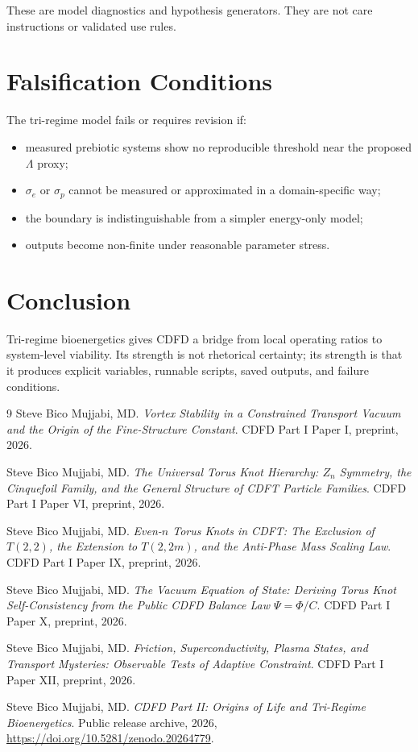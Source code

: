\documentclass[12pt,a4paper]{article}
\begin{document}
These are model diagnostics and hypothesis generators. They are not care
instructions or validated use rules.

\section{Falsification Conditions}
The tri-regime model fails or requires revision if:
\begin{itemize}
    \item measured prebiotic systems show no reproducible threshold near the
    proposed $\Lambda$ proxy;
    \item $\sigma_e$ or $\sigma_p$ cannot be measured or approximated in a
    domain-specific way;
    \item the boundary is indistinguishable from a simpler energy-only model;
    \item outputs become non-finite under reasonable parameter stress.
\end{itemize}

\section{Conclusion}
Tri-regime bioenergetics gives CDFD a bridge from local operating ratios to
system-level viability. Its strength is not rhetorical certainty; its strength
is that it produces explicit variables, runnable scripts, saved outputs, and
failure conditions.
\begin{thebibliography}{9}
Steve Bico Mujjabi, MD. \emph{Vortex Stability in a Constrained Transport Vacuum and the Origin of the Fine-Structure Constant}. CDFD Part I Paper I, preprint, 2026.

Steve Bico Mujjabi, MD. \emph{The Universal Torus Knot Hierarchy: $Z_n$ Symmetry, the Cinquefoil Family, and the General Structure of CDFT Particle Families}. CDFD Part I Paper VI, preprint, 2026.

Steve Bico Mujjabi, MD. \emph{Even-$n$ Torus Knots in CDFT: The Exclusion of $T(2,2)$, the Extension to $T(2,2m)$, and the Anti-Phase Mass Scaling Law}. CDFD Part I Paper IX, preprint, 2026.

Steve Bico Mujjabi, MD. \emph{The Vacuum Equation of State: Deriving Torus Knot Self-Consistency from the Public CDFD Balance Law $\Psi = \Phi/C$}. CDFD Part I Paper X, preprint, 2026.

Steve Bico Mujjabi, MD. \emph{Friction, Superconductivity, Plasma States, and Transport Mysteries: Observable Tests of Adaptive Constraint}. CDFD Part I Paper XII, preprint, 2026.

Steve Bico Mujjabi, MD. \emph{CDFD Part II: Origins of Life and Tri-Regime Bioenergetics}. Public release archive, 2026, \url{https://doi.org/10.5281/zenodo.20264779}.
\end{thebibliography}
\end{document}
